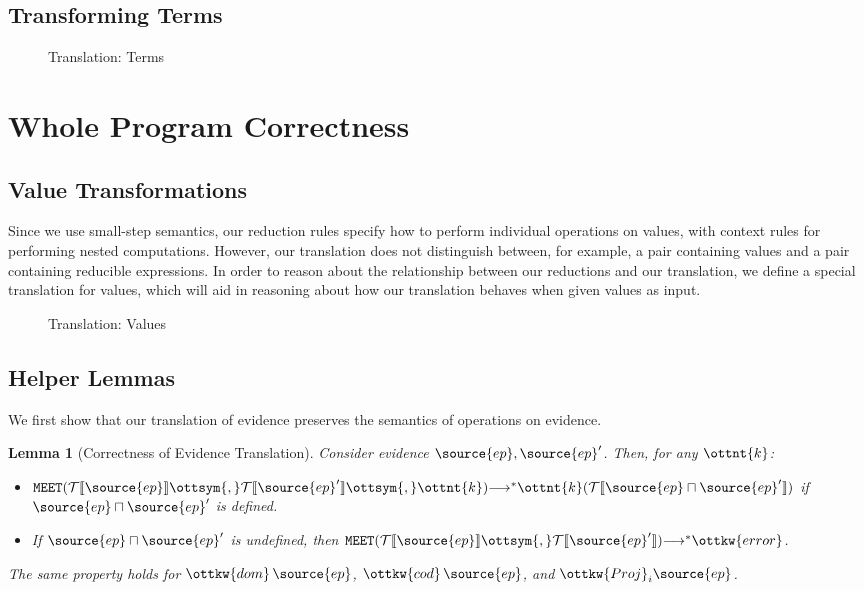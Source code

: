 \documentclass[11pt]{article}
\newtheorem{lemma}{Lemma}[section]
\begin{document}
\subsection{Transforming Terms}

\begin{figure}[H]
	\ottdefnTransform
	\caption{Translation: Terms}  
	\label{fig:trans-terms}
\end{figure}





\section{Whole Program Correctness}

\subsection{Value Transformations}

Since we use small-step semantics, our reduction rules specify how to perform individual operations
on values, with context rules for performing nested computations. However, our translation does not distinguish
between, for example, a pair containing values and a pair containing reducible expressions.
In order to reason about the relationship between our reductions and our translation,
we define a special translation for values, which will aid in reasoning about how our translation
behaves when given values as input.

\begin{figure}[H]
	\ottdefnValTransform
	\caption{Translation: Values}
	\label{fig:trans-values}
\end{figure}

\subsection{Helper Lemmas}

We first show that our translation of evidence preserves the semantics of operations on evidence.

\begin{lemma}[Correctness of Evidence Translation]
	\label{lem:ev-correct}
	Consider evidence $\source{ep},\source{ep}'$. Then, for any $\ottnt{k}$:
	\begin{itemize}
		\item $  \mathtt{MEET }  (  \mathcal{T}\llbracket  \source{ep}  \rrbracket   \ottsym{,}   \mathcal{T}\llbracket  \source{ep}'  \rrbracket   \ottsym{,}  \ottnt{k} )   {\longrightarrow^{*} }   \ottnt{k} (  \mathcal{T}\llbracket  \source{ep}  \sqcap  \source{ep}'  \rrbracket  ) $ if $\source{ep}  \sqcap  \source{ep}'$ is defined.
		\item If $\source{ep}  \sqcap  \source{ep}'$ is undefined, then $  \mathtt{MEET }  (  \mathcal{T}\llbracket  \source{ep}  \rrbracket   \ottsym{,}   \mathcal{T}\llbracket  \source{ep}'  \rrbracket  )   {\longrightarrow^{*} }  \ottkw{error}$.
	\end{itemize}
	The same property holds for $\ottkw{dom} \, \source{ep}$, $\ottkw{cod} \, \source{ep}$, and $ \ottkw{Proj}_{ i }  \source{ep} $. 
\end{lemma}
\end{document}
